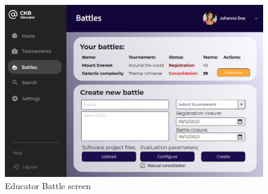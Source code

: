 \begin{figure}[h!]
    \centering
    \includegraphics[width=0.85\linewidth]{Images/UI_Educator_Battles.png}
    \caption{Educator Battle screen}
    \label{fig:enter-label}
\end{figure}

